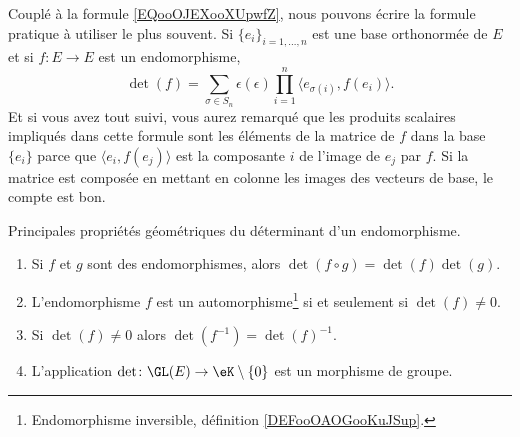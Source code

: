 Couplé à la formule \ref{EQooOJEXooXUpwfZ}, nous pouvons écrire la formule pratique à utiliser le plus souvent. Si \( \{ e_i \}_{i=1,\ldots, n}\) est une base orthonormée de \( E\) et si \( f\colon E\to E\) est un endomorphisme,
\begin{equation}
    \det(f)=\sum_{\sigma\in S_n}\epsilon(\epsilon)\prod_{i=1}^n\langle e_{\sigma(i)}, f(e_i)\rangle.
\end{equation}
Et si vous avez tout suivi, vous aurez remarqué que les produits scalaires impliqués dans cette formule sont les éléments de la matrice de \( f\) dans la base \( \{ e_i \}\) parce que \( \langle e_i, f(e_j)\rangle \) est la composante \( i\) de l'image de \( e_j\) par \( f\). Si la matrice est composée en mettant en colonne les images des vecteurs de base, le compte est bon.

\begin{proposition}     \label{PropYQNMooZjlYlA}
    Principales propriétés géométriques du déterminant d'un endomorphisme.
    \begin{enumerate}
        \item   \label{ItemUPLNooYZMRJy}
            Si \( f\) et \( g\)  sont des endomorphismes, alors \( \det(f\circ g)=\det(f)\det(g)\).
        \item       \label{ITEMooNZNLooODdXeH}
            L'endomorphisme \( f\) est un automorphisme\footnote{Endomorphisme inversible, définition \ref{DEFooOAOGooKuJSup}.} si et seulement si \( \det(f)\neq 0\).
        \item   \label{ITEMooZMVXooLGjvCy}
            Si \( \det(f)\neq 0\) alors \( \det(f^{-1})=\det(f)^{-1}\).
        \item       \label{ItemooPJVYooYSwqaE}
            L'application \( \det\colon \GL(E)\to \eK\setminus\{ 0 \}\) est un morphisme de groupe.
    \end{enumerate}
\end{proposition}

